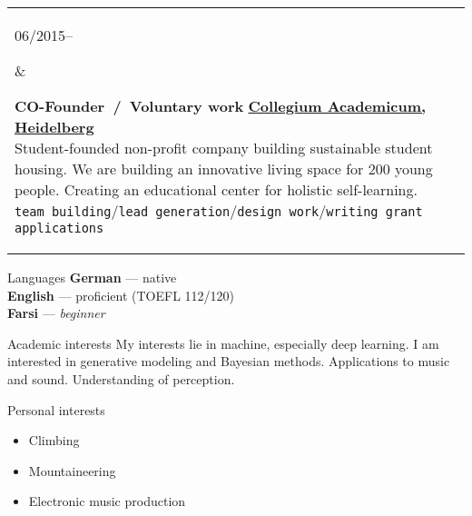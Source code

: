 \documentclass{article}
\newenvironment{entrylist}{
	\begin{longtable}[H]{l l}
}{
	\end{longtable}
}
\newcommand{\entry}[4]{%
	\parbox[t]{0.175\linewidth}{#1} &
	\parbox[t]{0.825\linewidth}{
		\textbf{#2}%
		\hfill%
		{\footnotesize \textbf{\textcolor{black}{#3}}}\\%
		{\small #4} %
    }\\\\}
\newcommand{\slashsep}{\hspace{2mm}/\hspace{2mm}}
\begin{document}
\begin{entrylist}
    \entry%
    {06/2015--}
    {CO-Founder\ /\ Voluntary work}
    {\href{https://collegiumacademicum.de}{Collegium Academicum, Heidelberg}}
    {
        Student-founded non-profit company building sustainable student housing.
        We are building an innovative living space for 200 young people.
        Creating an educational center for holistic self-learning.\\
        \texttt{team building}\slashsep\texttt{lead generation}\slashsep\texttt{design work}\slashsep\texttt{writing grant applications}
    }
\end{entrylist}

\begin{cvbox}{Languages}
	\textbf{German} --- native\\
	\textbf{English} --- proficient (TOEFL 112/120)\\
    \textbf{Farsi} --- \textit{beginner}
\end{cvbox}
\begin{cvbox}{Academic interests}
    My interests lie in machine, especially deep learning. I am interested in generative modeling and
    Bayesian methods. Applications to music and sound. Understanding of perception.
\end{cvbox}
\begin{cvbox}{Personal interests}
    \begin{itemize}[nosep, left=4pt]
        \item Climbing
        \item Mountaineering
        \item Electronic music production
    \end{itemize}
\end{cvbox}
\end{document}
